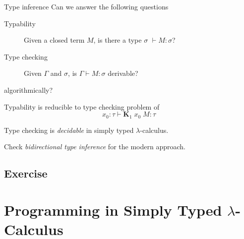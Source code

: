 \begin{frame}{Type inference}
  Can we answer the following questions
  \begin{description}
    \item[Typability] Given a closed term $M$, is there a type $\sigma$ $\vdash M : \sigma$? 
    \item[Type checking] Given $\Gamma$ and $\sigma$, is $\Gamma \vdash M : \sigma$ derivable?
  \end{description}
  algorithmically?
  
  Typability is reducible to type checking problem of
  \[
    x_0: \tau \vdash \textbf{K}_1\;x_0\;M : \tau
  \]

  \begin{theorem}
    Type checking is \emph{decidable}
    in simply typed $\lambda$-calculus.
  \end{theorem}

Check \emph{bidirectional type inference} for the modern approach.
\subsection*{Exercise}
  
\end{frame}

\section{Programming in Simply Typed $\lambda$-Calculus}

